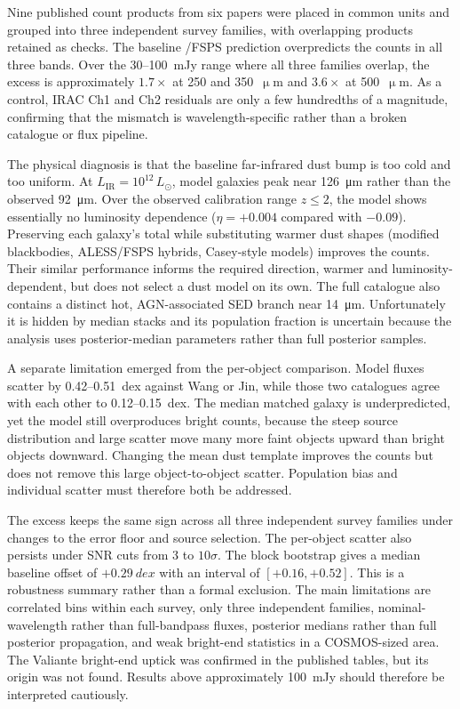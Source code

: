 \documentclass[12pt,a4paper]{article}
\begin{document}
Nine published count products from six papers were placed in common units and grouped
into three independent survey families, with overlapping products retained as checks.
The baseline \popcosmos{}/FSPS prediction overpredicts the counts in all three
bands. Over the 30--\SI{100}{mJy} range where all three families overlap, the excess is
approximately $1.7\times$ at 250 and 350~$\upmu$m and $3.6\times$ at 500~$\upmu$m. As a
control, IRAC Ch1 and Ch2 residuals are only a few hundredths of a magnitude, confirming
that the mismatch is wavelength-specific rather than a broken catalogue or flux pipeline.

The physical diagnosis is that the baseline far-infrared dust bump is too cold and too
uniform. At $L_\mathrm{IR} = 10^{12}\,L_\odot$, model galaxies peak near
\SI{126}{\um} rather than the observed \SI{92}{\um}. Over the observed calibration
range $z\leq2$, the model shows essentially no luminosity dependence
($\eta=+0.004$ compared with $-0.09$). Preserving each
galaxy's total \LIR{} while substituting warmer dust shapes (modified blackbodies,
ALESS/FSPS hybrids, Casey-style models) improves the counts. Their similar performance
informs the required direction, warmer and luminosity-dependent, but does not
select a dust model on its own. The full catalogue also contains a distinct hot,
AGN-associated SED branch near \SI{14}{\um}. Unfortunately it is hidden by median stacks and
its population fraction is uncertain because the analysis uses posterior-median
parameters rather than full posterior samples.

A separate limitation emerged from the per-object comparison. Model fluxes scatter by
0.42--\SI{0.51}{dex} against Wang or Jin, while those two catalogues agree with each
other to 0.12--\SI{0.15}{dex}. The median matched galaxy is underpredicted, yet
the model still overproduces bright counts, because the steep source distribution and
large scatter move many more faint objects upward than bright objects downward.
Changing the mean dust template improves the counts but does not remove this large
object-to-object scatter. Population bias and individual scatter must therefore both be
addressed.

The excess keeps the same sign across all three independent survey families under
changes to the error floor and source selection. The per-object scatter also persists
under SNR cuts from 3 to $10\sigma$. The block bootstrap gives a median baseline offset
of $+\SI{0.29}{dex}$ with an interval of $[+0.16,+0.52]$. This is a robustness
summary rather than a formal exclusion. The main limitations are correlated bins within
each survey, only three independent families, nominal-wavelength rather than
full-bandpass fluxes, posterior medians rather than full posterior propagation, and weak
bright-end statistics in a COSMOS-sized area. The Valiante bright-end uptick was
confirmed in the published tables, but its origin was not found. Results above
approximately \SI{100}{mJy} should therefore be interpreted cautiously.
\end{document}
